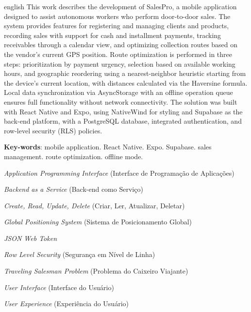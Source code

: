 \documentclass[
	12pt,				%
	oneside,			%
	a4paper,			%
	english,			%
	brazil				%
	]{abntex2}
\begin{document}
\begin{resumo}[Abstract]
 \begin{otherlanguage*}{english}
   This work describes the development of SalesPro, a mobile application designed to assist autonomous workers who perform door-to-door sales. The system provides features for registering and managing clients and products, recording sales with support for cash and installment payments, tracking receivables through a calendar view, and optimizing collection routes based on the vendor's current GPS position. Route optimization is performed in three steps: prioritization by payment urgency, selection based on available working hours, and geographic reordering using a nearest-neighbor heuristic starting from the device's current location, with distances calculated via the Haversine formula. Local data synchronization via AsyncStorage with an offline operation queue ensures full functionality without network connectivity. The solution was built with React Native and Expo, using NativeWind for styling and Supabase as the back-end platform, with a PostgreSQL database, integrated authentication, and row-level security (RLS) policies.

   \vspace{\onelineskip}

   \noindent
   \textbf{Key-words}: mobile application. React Native. Expo. Supabase. sales management. route optimization. offline mode.
 \end{otherlanguage*}
\end{resumo}

\listoffigures*
\cleardoublepage

\listoftables*
\cleardoublepage

\begin{siglas}
  \item[API] \textit{Application Programming Interface} (Interface de Programação de Aplicações)
  \item[BaaS] \textit{Backend as a Service} (Back-end como Serviço)
  \item[CRUD] \textit{Create, Read, Update, Delete} (Criar, Ler, Atualizar, Deletar)
  \item[GPS] \textit{Global Positioning System} (Sistema de Posicionamento Global)
  \item[JWT] \textit{JSON Web Token}
  \item[RLS] \textit{Row Level Security} (Segurança em Nível de Linha)
  \item[TSP] \textit{Traveling Salesman Problem} (Problema do Caixeiro Viajante)
  \item[UI] \textit{User Interface} (Interface do Usuário)
  \item[UX] \textit{User Experience} (Experiência do Usuário)
\end{siglas}
\end{document}
